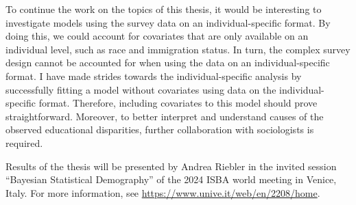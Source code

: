 To continue the work on the topics of this thesis, it would be interesting to investigate models using the survey data on an individual-specific format. By doing this, we could account for covariates that are only available on an individual level, such as race and immigration status. In turn, the complex survey design cannot be accounted for when using the data on an individual-specific format. I have made strides towards the individual-specific analysis by successfully fitting a model without covariates using data on the individual-specific format. Therefore, including covariates to this model should prove straightforward. Moreover, to better interpret and understand causes of the observed educational disparities, further collaboration with sociologists is required.

Results of the thesis will be presented by Andrea Riebler in the invited session “Bayesian Statistical Demography” of the 2024 ISBA world meeting in Venice, Italy. For more information, see \url{https://www.unive.it/web/en/2208/home}.
